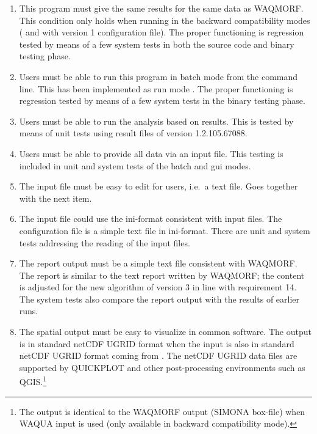 \begin{enumerate}
\item This program must give the same results for the same data as WAQMORF.
This condition only holds when running in the backward compatibility modes ( and  with version 1 configuration file).
The proper functioning is regression tested by means of a few system tests in both the source code and binary testing phase.

\item Users must be able to run this program in batch mode from the command line.
This has been implemented as run mode .
The proper functioning is regression tested by means of a few system tests in the binary testing phase.

\item Users must be able to run the analysis based on \dflowfm results.
This is tested by means of unit tests using result files of \dflowfm version 1.2.105.67088.

\item Users must be able to provide all data via an input file.
This testing is included in unit and system tests of the batch and gui modes.

\item The input file must be easy to edit for users, i.e.~a text file.
Goes together with the next item.

\item The input file could use the ini-format consistent with \dflowfm input files.
The \dfastmi configuration file is a simple text file in ini-format.
There are unit and system tests addressing the reading of the input files.

\item The report output must be a simple text file consistent with WAQMORF.
The report is similar to the text report written by WAQMORF; the content is adjusted for the new algorithm of \dfastmi version 3 in line with requirement 14.
The system tests also compare the report output with the results of earlier runs.

\item The spatial output must be easy to visualize in common software.
The output is in standard netCDF UGRID format when the input is also in standard netCDF UGRID format coming from \dflowfm.
The netCDF UGRID data files are supported by QUICKPLOT and other post-processing environments such as QGIS.\footnote{The output is identical to the WAQMORF output (SIMONA box-file) when WAQUA input is used (only available in backward compatibility mode).}


\end{enumerate}
